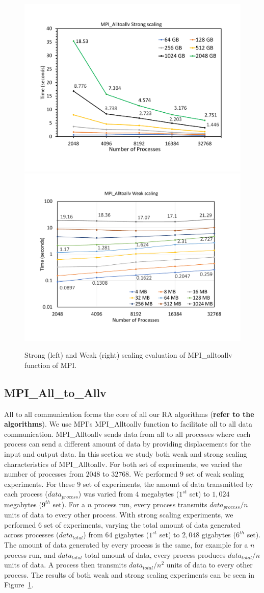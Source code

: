 \begin{figure}[t]
	{\includegraphics[width=.50\textwidth,  trim={0cm 0cm 0cm 0cm, 
			clip}]{results/all_to_all_strong.pdf}}\hfill%
	{\includegraphics[width=.50\textwidth,  trim={0cm 0cm 0cm 0cm,
			clip}]{results/all_to_all_weak.pdf}}\hfill%
	\centering
	\caption{Strong (left) and Weak (right) scaling evaluation of MPI\_alltoallv function of MPI. }
	\label{fig:all_to_all}
\end{figure}


\subsection{MPI\_All\_to\_Allv}
\label{sec:all_to_all}


All to all communication forms the core of all our RA algorithms (\textbf{refer to the algorithms}).
We use MPI's MPI\_Alltoallv function to facilitate all to all data communication.
MPI\_Alltoallv sends data from all to all processes where each process can send a different amount of data by providing displacements for the input and output data. In this section we study both weak and strong scaling characteristics of MPI\_Alltoallv.
For both set of experiments, we varied the number of processes from $2048$ to $32768$. We performed $9$ set of weak scaling experiments. For these $9$ set of experiments, the amount of data transmitted by each process ($data_{process}$) was varied from $4$ megabytes ($1^{st}$ set) to $1,024$ megabytes ($9^{th}$ set). For a $n$ process run, every process transmits $data_{process}/n$ units of data to every other process. With strong scaling experiments, we performed 6 set of experiments, varying the total amount of data generated across processes ($data_{total}$) from $64$ gigabytes ($1^{st}$ set) to $2,048$ gigabytes ($6^{th}$ set). The amount of data generated by every process is the same, for example for a $n$ process run, and $data_{total}$ total amount of data, every process produces $data_{total}/n$ units of data. A process then transmits $data_{total}/n^2$ units of data to every other process.  The results of both weak and strong scaling experiments can be seen in Figure~\ref{fig:all_to_all}.

